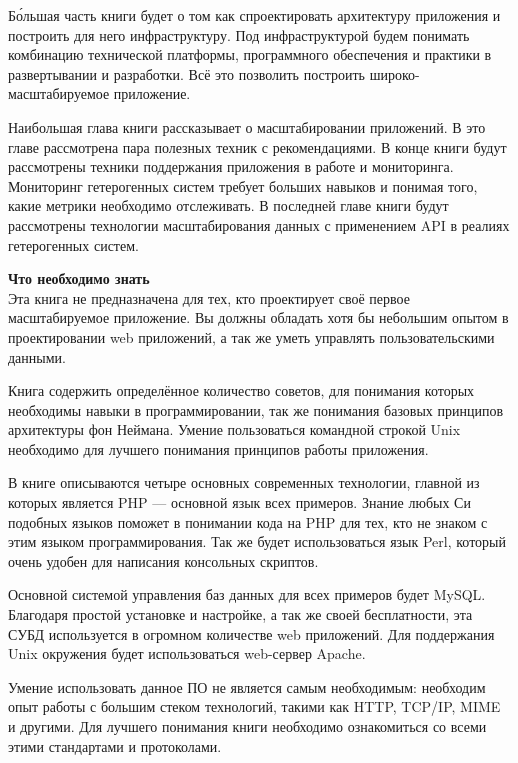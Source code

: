 Б\'{о}льшая часть книги будет о том как спроектировать архитектуру приложения и построить для него инфраструктуру. Под инфраструктурой будем понимать  комбинацию технической платформы, программного обеспечения и практики в развертывании и разработки. Всё это позволить построить широко-масштабируемое приложение.

Наибольшая глава книги рассказывает о масштабировании приложений.  В это главе рассмотрена пара полезных техник с рекомендациями. В конце книги будут рассмотрены техники поддержания приложения в работе и мониторинга. Мониторинг гетерогенных систем требует больших навыков и понимая того, какие метрики необходимо отслеживать. В последней главе книги будут рассмотрены  технологии масштабирования данных с применением API в реалиях гетерогенных систем.

\textbf{Что необходимо знать}\\

Эта книга не предназначена для тех, кто проектирует своё первое масштабируемое приложение. Вы должны обладать хотя бы небольшим опытом в проектировании web приложений, а так же уметь управлять пользовательскими данными.


Книга содержить определённое количество советов, для понимания которых необходимы навыки в программировании, так же понимания базовых принципов архитектуры фон Неймана. Умение пользоваться командной строкой Unix необходимо для лучшего понимания принципов работы приложения. 

В книге описываются четыре основных современных технологии, главной из которых является PHP --- основной язык всех примеров. Знание любых Си подобных языков поможет в понимании кода на PHP для тех, кто не знаком с этим языком программирования. Так же будет использоваться язык Perl, который очень удобен для написания  консольных скриптов.


Основной системой управления баз данных для всех примеров будет MySQL. Благодаря простой установке и настройке, а так же своей бесплатности, эта СУБД используется в огромном количестве web приложений. Для поддержания Unix окружения будет использоваться web-сервер Apache.

Умение использовать данное ПО не является самым необходимым: необходим опыт работы с большим стеком технологий, такими как HTTP, TCP/IP, MIME и другими. Для лучшего понимания книги необходимо ознакомиться со всеми этими стандартами и протоколами.








\clearpage